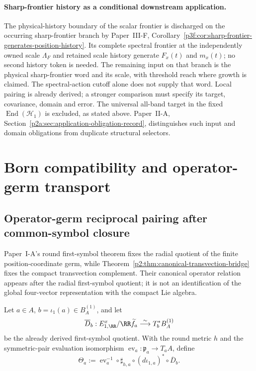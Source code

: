 \documentclass[12pt,a4paper]{article}
\begin{document}
\paragraph{Sharp-frontier history as a conditional downstream application.}
The physical-history boundary of the scalar frontier is discharged on the occurring
sharp-frontier branch by Paper~III-F,
Corollary~\ref{p3f:cor:sharp-frontier-generates-position-history}.
Its complete spectral frontier at the independently owned scale $\Lambda_F$
and retained scale history generate $F_x(t)$ and $m_x(t)$; no second
history token is needed. The remaining input on that branch is the physical
sharp-frontier word and its scale, with threshold reach where growth is
claimed. The spectral-action cutoff alone does not supply that word.
Local pairing is already derived; a stronger comparison must specify its
target, covariance, domain and error. The universal all-band target in the
fixed $\operatorname{End}(\mathcal H_1)$ is excluded, as stated above.
Paper~II-A, Section~\ref{p2a:sec:application-obligation-record}, distinguishes
such input and domain obligations from duplicate structural selectors.


\section{Born compatibility and operator-germ transport}
\label{paper2c:sec:organized-born}

\subsection{Operator-germ reciprocal pairing after common-symbol closure}
\label{p2c:sec:operator-germ-pairing-update}

Paper~I-A's round first-symbol theorem fixes the radial quotient of the finite
position-coordinate germ, while
Theorem~\ref{p2:thm:canonical-transvection-bridge} fixes the compact
transvection complement.  Their canonical operator relation appears after the
radial first-symbol quotient; it is not an identification of the global
four-vector representation with the compact Lie algebra.

Let $a\in A$, $b=\iota_1(a)\in B_A^{(1)}$, and let
\[
 \overline D_b:
 E_{1,\RR}^x/\RR\widetilde f_a
 \overset\sim\longrightarrow T_b^*B_A^{(1)}
\]
be the already derived first-symbol quotient.  With the round metric $h$ and
the symmetric-pair evaluation isomorphism
$\operatorname{ev}_a:\mathfrak p_a\to T_aA$, define
\begin{equation}
 \label{p2c:eq:theta-xp-local}
 \Theta_a
 :=\operatorname{ev}_a^{-1}\circ\sharp_{h,a}\circ
 (d\iota_{1,a})^*\circ\overline D_b.
\end{equation}
\end{document}
